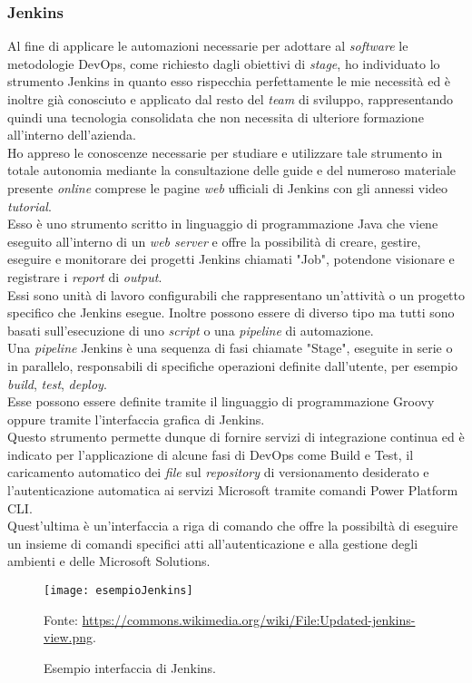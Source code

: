 \subsubsection*{Jenkins}
Al fine di applicare le automazioni necessarie per adottare al \emph{software} le metodologie \gls{DevOps}, come richiesto dagli obiettivi di \emph{stage}, ho individuato lo strumento Jenkins in quanto esso rispecchia perfettamente le mie necessità ed è inoltre già conosciuto e applicato dal resto del \emph{team} di sviluppo, rappresentando quindi una tecnologia consolidata che non necessita di ulteriore formazione all'interno dell'azienda.\\
Ho appreso le conoscenze necessarie per studiare e utilizzare tale strumento in totale autonomia mediante la consultazione delle guide e del numeroso materiale presente \emph{online} comprese le pagine \emph{web} ufficiali di Jenkins con gli annessi video \emph{tutorial}.\\
Esso è uno strumento scritto in linguaggio di programmazione Java che viene eseguito all'interno di un \emph{web server} e offre la possibilità di creare, gestire, eseguire e monitorare dei progetti Jenkins chiamati "Job", potendone visionare e registrare i \emph{report} di \emph{output}.\\
Essi sono unità di lavoro configurabili che rappresentano un'attività o un progetto specifico che Jenkins esegue. Inoltre possono essere di diverso tipo ma tutti sono basati sull'esecuzione di uno \emph{script} o una \emph{pipeline} di automazione.\\
Una \emph{pipeline} Jenkins è una sequenza di fasi chiamate "Stage", eseguite in serie o in parallelo, responsabili di specifiche operazioni definite dall'utente, per esempio \emph{build}, \emph{test}, \emph{deploy}.\\
Esse possono essere definite tramite il linguaggio di programmazione Groovy oppure tramite l'interfaccia grafica di Jenkins.\\
Questo strumento permette dunque di fornire servizi di integrazione continua ed è indicato per l'applicazione di alcune fasi di \gls{DevOps} come Build e Test, il caricamento automatico dei \emph{file} sul \emph{repository} di versionamento desiderato e l'autenticazione automatica ai servizi Microsoft tramite comandi Power Platform CLI.\\
Quest'ultima è un'interfaccia a riga di comando che offre la possibiltà di eseguire un insieme di comandi specifici atti all'autenticazione e alla gestione degli ambienti e delle Microsoft Solutions.\\
\begin{figure}[htbp] 
    \centering 
    \texttt{[image: esempioJenkins]} 
    \caption{Esempio interfaccia di Jenkins.}
    \label{fig:esempioJenkins}
    \vspace{1mm}
    Fonte: \url{https://commons.wikimedia.org/wiki/File:Updated-jenkins-view.png}.
\end{figure}

